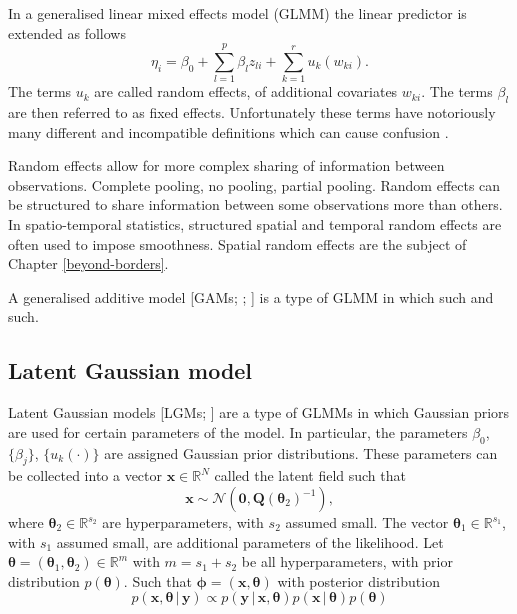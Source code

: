 \documentclass[a4paper, nobind]{templates/ociamthesis}
\begin{document}
In a generalised linear mixed effects model (GLMM) the linear predictor is extended as follows
\begin{equation}
\eta_i = \beta_0 + \sum_{l = 1}^{p} \beta_l z_{li} + \sum_{k = 1}^{r} u_k(w_{ki}).
\end{equation}
The terms \(u_k\) are called random effects, of additional covariates \(w_{ki}\).
The terms \(\beta_l\) are then referred to as fixed effects.
Unfortunately these terms have notoriously many different and incompatible definitions which can cause confusion \autocite{gelman2005analysis}.

Random effects allow for more complex sharing of information between observations.
Complete pooling, no pooling, partial pooling.
Random effects can be structured to share information between some observations more than others.
In spatio-temporal statistics, structured spatial and temporal random effects are often used to impose smoothness.
Spatial random effects are the subject of Chapter \ref{beyond-borders}.

A generalised additive model {[}GAMs; \textcite{wood2017generalized}; \textcite{hastie1987generalized}{]} is a type of GLMM in which such and such.

\hypertarget{lgm}{%
\subsection{Latent Gaussian model}\label{lgm}}

Latent Gaussian models {[}LGMs; \textcite{rue2009approximate}{]} are a type of GLMMs in which Gaussian priors are used for certain parameters of the model.
In particular, the parameters \(\beta_0\), \(\{\beta_j\}\), \(\{u_k(\cdot)\}\) are assigned Gaussian prior distributions.
These parameters can be collected into a vector \(\mathbf{x} \in \mathbb{R}^N\) called the latent field such that
\begin{equation}
\mathbf{x} \sim \mathcal{N}(\mathbf{0}, \mathbf{Q}(\boldsymbol{\mathbf{\theta}}_2)^{-1}),
\end{equation}
where \(\boldsymbol{\mathbf{\theta}}_2 \in \mathbb{R}^{s_2}\) are hyperparameters, with \(s_2\) assumed small.
The vector \(\boldsymbol{\mathbf{\theta}}_1 \in \mathbb{R}^{s_1}\), with \(s_1\) assumed small, are additional parameters of the likelihood.
Let \(\boldsymbol{\mathbf{\theta}} = (\boldsymbol{\mathbf{\theta}}_1, \boldsymbol{\mathbf{\theta}}_2) \in \mathbb{R}^m\) with \(m = s_1 + s_2\) be all hyperparameters, with prior distribution \(p(\boldsymbol{\mathbf{\theta}})\).
Such that \(\boldsymbol{\mathbf{\phi}} = (\mathbf{x}, \boldsymbol{\mathbf{\theta}})\) with posterior distribution
\begin{equation}
p(\mathbf{x}, \boldsymbol{\mathbf{\theta}} \, | \, \mathbf{y}) \propto p(\mathbf{y} \, | \, \mathbf{x}, \boldsymbol{\mathbf{\theta}}) p(\mathbf{x} \, | \, \boldsymbol{\mathbf{\theta}}) p(\boldsymbol{\mathbf{\theta}})
\end{equation}
\end{document}
